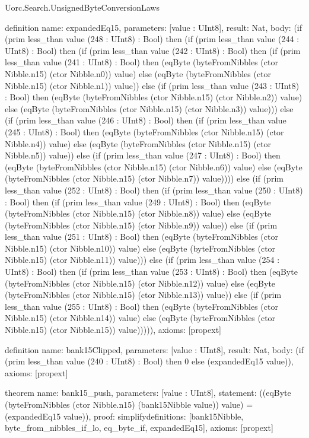 \begin{lexlean}{Uorc.Search.UnsignedByteConversionLaws}
\begin{semanticmodule}
definition{
  name: expandedEq15,
  parameters: [value : UInt8],
  result: Nat,
  body: (if (prim less_than value (248 : UInt8) : Bool) then (if (prim less_than value (244 : UInt8) : Bool) then (if (prim less_than value (242 : UInt8) : Bool) then (if (prim less_than value (241 : UInt8) : Bool) then (eqByte (byteFromNibbles (ctor Nibble.n15) (ctor Nibble.n0)) value) else (eqByte (byteFromNibbles (ctor Nibble.n15) (ctor Nibble.n1)) value)) else (if (prim less_than value (243 : UInt8) : Bool) then (eqByte (byteFromNibbles (ctor Nibble.n15) (ctor Nibble.n2)) value) else (eqByte (byteFromNibbles (ctor Nibble.n15) (ctor Nibble.n3)) value))) else (if (prim less_than value (246 : UInt8) : Bool) then (if (prim less_than value (245 : UInt8) : Bool) then (eqByte (byteFromNibbles (ctor Nibble.n15) (ctor Nibble.n4)) value) else (eqByte (byteFromNibbles (ctor Nibble.n15) (ctor Nibble.n5)) value)) else (if (prim less_than value (247 : UInt8) : Bool) then (eqByte (byteFromNibbles (ctor Nibble.n15) (ctor Nibble.n6)) value) else (eqByte (byteFromNibbles (ctor Nibble.n15) (ctor Nibble.n7)) value)))) else (if (prim less_than value (252 : UInt8) : Bool) then (if (prim less_than value (250 : UInt8) : Bool) then (if (prim less_than value (249 : UInt8) : Bool) then (eqByte (byteFromNibbles (ctor Nibble.n15) (ctor Nibble.n8)) value) else (eqByte (byteFromNibbles (ctor Nibble.n15) (ctor Nibble.n9)) value)) else (if (prim less_than value (251 : UInt8) : Bool) then (eqByte (byteFromNibbles (ctor Nibble.n15) (ctor Nibble.n10)) value) else (eqByte (byteFromNibbles (ctor Nibble.n15) (ctor Nibble.n11)) value))) else (if (prim less_than value (254 : UInt8) : Bool) then (if (prim less_than value (253 : UInt8) : Bool) then (eqByte (byteFromNibbles (ctor Nibble.n15) (ctor Nibble.n12)) value) else (eqByte (byteFromNibbles (ctor Nibble.n15) (ctor Nibble.n13)) value)) else (if (prim less_than value (255 : UInt8) : Bool) then (eqByte (byteFromNibbles (ctor Nibble.n15) (ctor Nibble.n14)) value) else (eqByte (byteFromNibbles (ctor Nibble.n15) (ctor Nibble.n15)) value))))),
  axioms: [propext]
}

definition{
  name: bank15Clipped,
  parameters: [value : UInt8],
  result: Nat,
  body: (if (prim less_than value (240 : UInt8) : Bool) then 0 else (expandedEq15 value)),
  axioms: [propext]
}

theorem{
  name: bank15_push,
  parameters: [value : UInt8],
  statement: ((eqByte (byteFromNibbles (ctor Nibble.n15) (bank15Nibble value)) value) = (expandedEq15 value)),
  proof: simplify{definitions: [bank15Nibble, byte_from_nibbles_if_lo, eq_byte_if, expandedEq15]},
  axioms: [propext]
}


\end{semanticmodule}
\end{lexlean}

